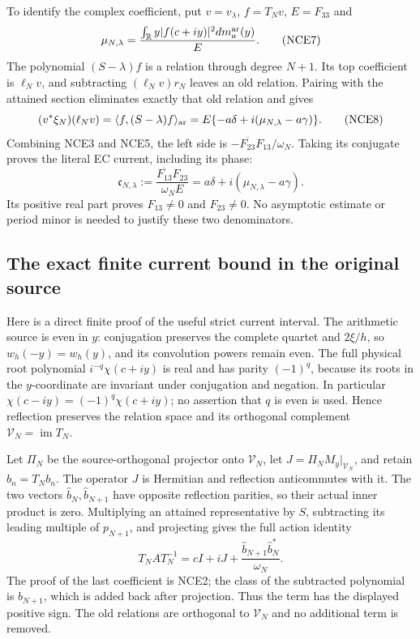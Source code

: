 \documentclass[11pt,a4paper]{article}
\begin{document}
To identify the complex coefficient, put $v=v_\lambda$,
$f=T_Nv$, $E=F_{33}$ and
\[
 \mu_{N,\lambda}
   =\frac{\int_{\mathbb R}y|f(c+iy)|^2dm_a^{\rm ar}(y)}{E}.
 \tag{NCE7}
\]
The polynomial $(S-\lambda)f$ is a relation through degree $N+1$.
Its top coefficient is $\ell_Nv$, and subtracting
$(\ell_Nv)r_N$ leaves an old relation. Pairing with the attained
section eliminates exactly that old relation and gives
\[
 (v^*\xi_N)(\ell_Nv)
   =\langle f,(S-\lambda)f\rangle_{\rm ar}
   =E\{-a\delta+i(\mu_{N,\lambda}-a\gamma)\}.
 \tag{NCE8}
\]
Combining NCE3 and NCE5, the left side is
$-\overline{F_{23}}F_{13}/\omega_N$. Taking its conjugate proves
the literal EC current, including its phase:
\[
 \boxed{\quad
 \mathfrak c_{N,\lambda}
 :=\frac{\overline{F_{13}}F_{23}}{\omega_NE}
 =a\delta+i(\mu_{N,\lambda}-a\gamma).
 \quad}                                                         \tag{NCE9}
\]
Its positive real part proves $F_{13}\ne0$ and $F_{23}\ne0$.
No asymptotic estimate or period minor is needed to justify these
two denominators.

\subsection{The exact finite current bound in the original source}

Here is a direct finite proof of the useful strict current interval.
The arithmetic source is even in $y$: conjugation preserves the
complete quartet and $2\xi/h$, so $w_h(-y)=w_h(y)$, and its
convolution powers remain even. The full physical root polynomial
$i^{-q}\chi(c+iy)$ is real and has parity $(-1)^q$, because its
roots in the $y$-coordinate are invariant under conjugation and negation.
In particular $\chi(c-iy)=(-1)^q\chi(c+iy)$; no assertion that
$q$ is even is used.
Hence reflection preserves the relation space and its orthogonal
complement $\mathcal V_N=\operatorname{im}T_N$.

Let $\Pi_N$ be the source-orthogonal projector onto $\mathcal V_N$,
let $J=\Pi_NM_y|_{\mathcal V_N}$, and retain
$\widehat b_n=T_Nb_n$. The operator $J$ is Hermitian and
reflection anticommutes with it. The two vectors
$\widehat b_N,\widehat b_{N+1}$ have opposite reflection parities,
so their actual inner product is zero.
Multiplying an attained representative by $S$, subtracting its
leading multiple of $p_{N+1}$, and projecting gives the full
action identity
\[
 T_NAT_N^{-1}
   =cI+iJ+
       \frac{\widehat b_{N+1}\widehat b_N^*}{\omega_N}.
 \tag{NCE10}
\]
The proof of the last coefficient is NCE2; the class of the
subtracted polynomial is $b_{N+1}$, which is added back after
projection. Thus the term has the displayed positive sign.
The old relations are orthogonal to $\mathcal V_N$ and no
additional term is removed.
\end{document}
